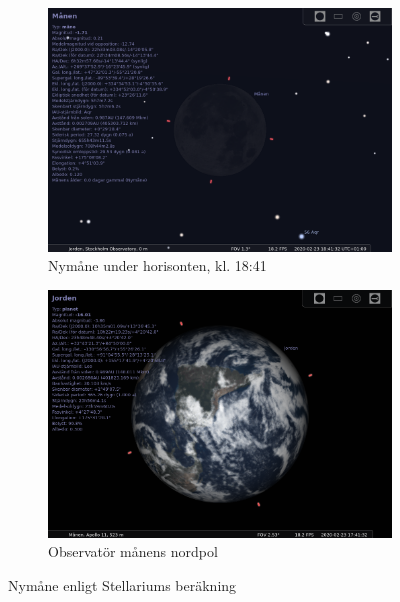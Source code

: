 \documentclass[./exercises.tex]{subfiles}
\begin{document}
\begin{itemize}
\begin{figure}[H]
     \hfill
     \begin{subfigure}[b]{0.45\textwidth}
         \centering
         \includegraphics[width=\textwidth]{Stellarium1/NewMoon/stellarium-003.png}
         \caption{Nymåne under horisonten, kl. 18:41}
         \label{fig:three sin x}
     \end{subfigure}
     \hfill
     \begin{subfigure}[b]{0.45\textwidth}
         \centering
         \includegraphics[width=\textwidth]{Stellarium1/NewMoon/stellarium-005.png}
         \caption{Observatör månens nordpol}
         \label{fig:three sin x}
     \end{subfigure}
     \hfill
        \caption{Nymåne enligt Stellariums beräkning }
        \label{fig:perod graphs}
\end{figure}

\end{itemize}
\end{document}
